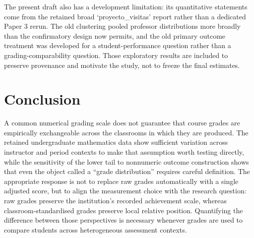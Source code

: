The present draft also has a development limitation: its quantitative statements come from the retained broad `proyecto\_visitas' report rather than a dedicated Paper 3 rerun. The old clustering pooled professor distributions more broadly than the confirmatory design now permits, and the old primary outcome treatment was developed for a student-performance question rather than a grading-comparability question. Those exploratory results are included to preserve provenance and motivate the study, not to freeze the final estimates.



\section{Conclusion}

A common numerical grading scale does not guarantee that course grades are empirically exchangeable across the classrooms in which they are produced. The retained undergraduate mathematics data show sufficient variation across instructor and period contexts to make that assumption worth testing directly, while the sensitivity of the lower tail to nonnumeric outcome construction shows that even the object called a ``grade distribution'' requires careful definition. The appropriate response is not to replace raw grades automatically with a single adjusted score, but to align the measurement choice with the research question: raw grades preserve the institution's recorded achievement scale, whereas classroom-standardised grades preserve local relative position. Quantifying the difference between those perspectives is necessary whenever grades are used to compare students across heterogeneous assessment contexts.

\printbibliography


